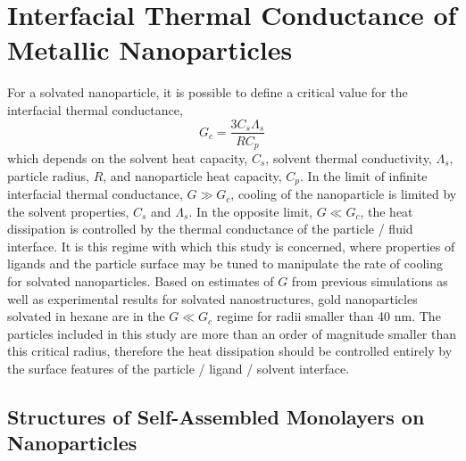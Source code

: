 \section{Interfacial Thermal Conductance of Metallic Nanoparticles}

For a solvated nanoparticle, it is possible to define a critical value
for the interfacial thermal conductance,
\begin{equation}
G_c = \frac{3 C_s \Lambda_s}{R C_p}
\end{equation}
which depends on the solvent heat capacity, $C_s$, solvent thermal
conductivity, $\Lambda_s$, particle radius, $R$, and nanoparticle heat
capacity, $C_p$.\cite{Wilson:2002uq} In the limit of infinite
interfacial thermal conductance, $G \gg G_c$, cooling of the
nanoparticle is limited by the solvent properties, $C_s$ and
$\Lambda_s$.  In the opposite limit, $G \ll G_c$, the heat dissipation
is controlled by the thermal conductance of the particle / fluid
interface. It is this regime with which this study is concerned, where
properties of ligands and the particle surface may be tuned to
manipulate the rate of cooling for solvated nanoparticles.  Based on
estimates of $G$ from previous simulations as well as experimental
results for solvated nanostructures, gold nanoparticles solvated in
hexane are in the $G \ll G_c$ regime for radii smaller than 40 nm. The
particles included in this study are more than an order of magnitude
smaller than this critical radius, therefore the heat dissipation should be
controlled entirely by the surface features of the particle / ligand /
solvent interface.

\subsection{Structures of Self-Assembled Monolayers on Nanoparticles}

